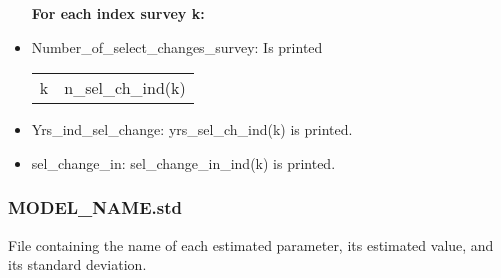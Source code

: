\documentclass{article}
\begin{document}
\begin{itemize}
    \textbf{For each index survey k:}
    \item Number\_of\_select\_changes\_survey: Is printed
    \begin{center}
        \begin{tabular}{c c}
           k  & n\_sel\_ch\_ind(k) \\
        \end{tabular}
    \end{center}
    \item Yrs\_ind\_sel\_change: yrs\_sel\_ch\_ind(k) is printed.
    \item sel\_change\_in:  sel\_change\_in\_ind(k) is printed.

     
    \end{itemize}    






    
    \subsubsection{MODEL\_NAME.std} File containing the name of each estimated parameter, its estimated value, and its standard deviation.
\end{document}
